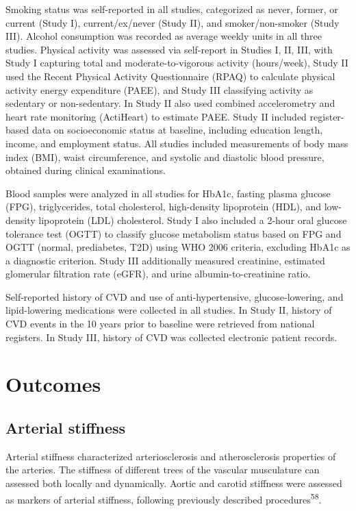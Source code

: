\documentclass[
  a4paper,
  headsepline=true,
  open=any]{scrbook}
\begin{document}
Smoking status was self-reported in all studies, categorized as never,
former, or current (Study I), current/ex/never (Study II), and
smoker/non-smoker (Study III). Alcohol consumption was recorded as
average weekly units in all three studies. Physical activity was
assessed via self-report in Studies I, II, III, with Study I capturing
total and moderate-to-vigorous activity (hours/week), Study II used the
Recent Physical Activity Questionnaire (RPAQ) to calculate physical
activity energy expenditure (PAEE), and Study III classifying activity
as sedentary or non-sedentary. In Study II also used combined
accelerometry and heart rate monitoring (ActiHeart) to estimate PAEE.
Study II included register-based data on socioeconomic status at
baseline, including education length, income, and employment status. All
studies included measurements of body mass index (BMI), waist
circumference, and systolic and diastolic blood pressure, obtained
during clinical examinations.

Blood samples were analyzed in all studies for HbA1c, fasting plasma
glucose (FPG), triglycerides, total cholesterol, high-density
lipoprotein (HDL), and low-density lipoprotein (LDL) cholesterol. Study
I also included a 2-hour oral glucose tolerance test (OGTT) to classify
glucose metabolism status based on FPG and OGTT (normal, prediabetes,
T2D) using WHO 2006 criteria, excluding HbA1c as a diagnostic criterion.
Study III additionally measured creatinine, estimated glomerular
filtration rate (eGFR), and urine albumin-to-creatinine ratio.

Self-reported history of CVD and use of anti-hypertensive,
glucose-lowering, and lipid-lowering medications were collected in all
studies. In Study II, history of CVD events in the 10 years prior to
baseline were retrieved from national registers. In Study III, history
of CVD was collected electronic patient records.

\hypertarget{outcomes}{%
\section{Outcomes}\label{outcomes}}

\hypertarget{arterial-stiffness}{%
\subsection{Arterial stiffness}\label{arterial-stiffness}}

Arterial stiffness characterized arteriosclerosis and atherosclerosis
properties of the arteries. The stiffness of different trees of the
vascular musculature can assessed both locally and dynamically. Aortic
and carotid stiffness were assessed as markers of arterial stiffness,
following previously described procedures\textsuperscript{58}.
\end{document}
